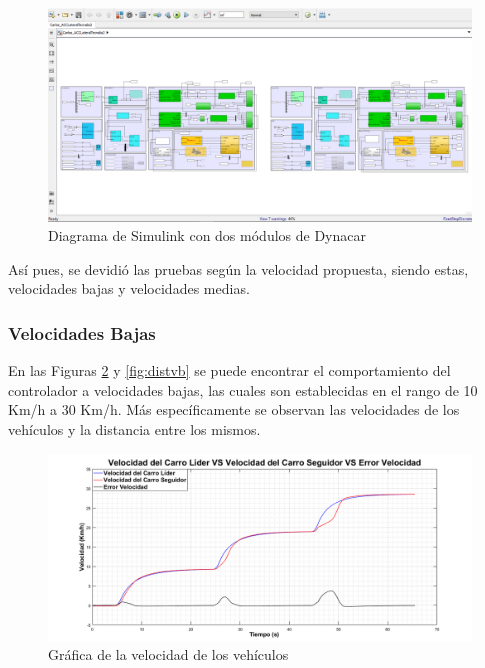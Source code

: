 \begin{figure}[!h]
	\centering
		\includegraphics[scale=0.30]{Imagenes/dyna2}
		\caption{Diagrama de Simulink con dos módulos de Dynacar}
		\label{fig:dyna2}
\end{figure}	 

\par Así pues, se devidió las pruebas según la velocidad propuesta, siendo estas, velocidades bajas y velocidades medias.
\subsubsection{Velocidades Bajas}
En las Figuras \ref{fig:velvb} y \ref{fig:distvb} se puede encontrar el comportamiento del controlador a velocidades bajas, las cuales son establecidas en el rango de 10 Km/h a 30 Km/h. Más específicamente se observan las velocidades de los vehículos y la distancia entre los mismos.\\

\begin{figure}[H]
	\centering
		\includegraphics[scale=0.35]{Imagenes/accvb}
		\caption{Gráfica de la velocidad de los vehículos}
		\label{fig:velvb}
\end{figure}	

